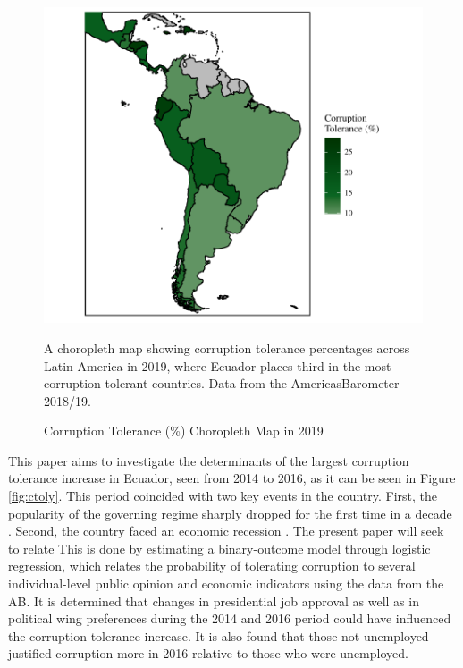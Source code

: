 \documentclass[12pt,a4]{article}
\begin{document}

\begin{figure}[htbp!]
    \begin{center}
    \includegraphics{images/ctol_map.pdf}
    \end{center}
      \label{fig:ctolmap}
      \caption{Corruption Tolerance (\%) Choropleth Map in 2019}
A choropleth map showing corruption tolerance percentages across Latin America in 2019, where Ecuador places third in the most corruption tolerant countries. Data from the \textregistered AmericasBarometer 2018/19. 
\end{figure}

This paper aims to investigate the determinants of the largest corruption tolerance increase in Ecuador, seen from 2014 to 2016, as it can be seen in Figure \ref{fig:ctoly}. This period coincided with two key events in the country. First, the popularity of the governing regime sharply dropped for the first time in a decade \parencite{Quillupangui.2016}. Second, the country faced an economic recession \parencite{Weisbrot.2017}. The present paper will seek to relate  This is done by estimating a binary-outcome model through logistic regression, which relates the probability of tolerating corruption to several individual-level public opinion and economic indicators using the data from the AB. It is determined that changes in presidential job approval as well as in political wing preferences during the 2014 and 2016 period could have influenced the corruption tolerance increase. It is also found that those not unemployed justified corruption more in 2016 relative to those who were unemployed.
\end{document}

